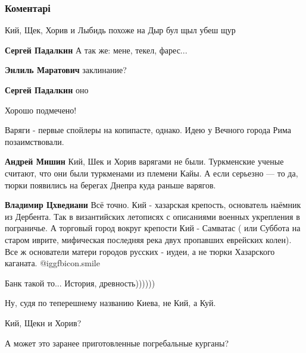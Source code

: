  
 
 
 
 
\subsubsection{Коментарі}

\begin{itemize} %
Кий, Щек, Хорив и Лыбидь похоже на Дыр бул щыл убеш щур

\begin{itemize} %
\textbf{Сергей Падалкин} А так же: мене, текел, фарес...

\textbf{Энлиль Маратович} заклинание?

\textbf{Сергей Падалкин} оно
\end{itemize} %

Хорошо подмечено!

Варяги - первые спойлеры на копипасте, однако. Идею у Вечного города Рима позаимствовали.

\begin{itemize} %
\textbf{Андрей Мишин} Кий, Шек и Хорив варягами не были. Туркменские ученые считают, что они были туркменами из племени Кайы. А если серьезно — то да, тюрки появились на берегах Днепра куда раньше варягов.

\textbf{Владимир Цхведиани} Всё точно. Кий - хазарская крепость, основатель наёмник из Дербента. Так в византийских летописях с описаниями военных укрепления в пограничье. А торговый город вокруг крепости Кий - Самватас ( или Суббота на старом иврите, мифическая последняя река двух пропавших еврейских колен). Все ж основатели матери городов русских - иудеи, а не тюрки Хазарского каганата.  @igg{fbicon.smile} 
\end{itemize} %

Банк такой то... История, древность))))))

Ну, судя по теперешнему названию Киева, не Кий, а Куй.

Кий, Щекн и Хорив?

А может это заранее приготовленные погребальные курганы?

\end{itemize} %
